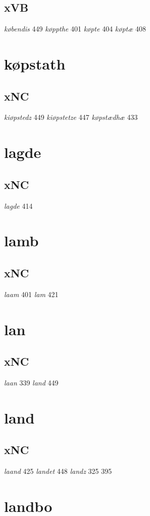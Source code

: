 \documentclass[a4paper,twocolumn]{article}
\begin{document}
\subsection{xVB}
\label{sec:orga4600b1}
\emph{købendis} 449 \emph{køppthe} 401 \emph{køpte} 404 \emph{køptæ} 408 
\section{køpstath}
\label{sec:org81573ae}
\subsection{xNC}
\label{sec:org987387b}
\emph{kiøpstedz} 449 \emph{kiøpstetze} 447 \emph{køpstædhæ} 433 
\section{lagde}
\label{sec:orgee40cbe}
\subsection{xNC}
\label{sec:orgb17bdce}
\emph{lagde} 414 
\section{lamb}
\label{sec:orgb912b40}
\subsection{xNC}
\label{sec:org3acef28}
\emph{laam} 401 \emph{lam} 421 
\section{lan}
\label{sec:org065b3e7}
\subsection{xNC}
\label{sec:orgf83de66}
\emph{laan} 339 \emph{land} 449 
\section{land}
\label{sec:orgf71b653}
\subsection{xNC}
\label{sec:orga3f1219}
\emph{laand} 425 \emph{landet} 448 \emph{landz} 325 395 
\section{landbo}
\label{sec:org0b23c5d}
\end{document}
